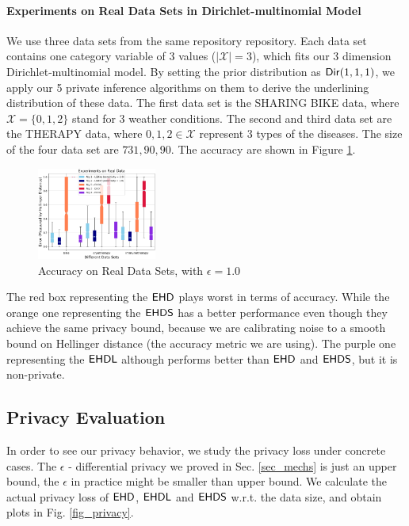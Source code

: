 \documentclass{article}
\begin{document}
\paragraph{Experiments on Real Data Sets in Dirichlet-multinomial Model}
We use three data sets from the same repository repository. Each data set contains one category variable of 3 values ($|\mathcal{X}| = 3$), which fits our 3 dimension Dirichlet-multinomial model. By setting the prior distribution as $\mathsf{Dir}(1,1,1)$, we apply our 5 private inference algorithms on them to derive the underlining distribution of these data. The first data set is the SHARING BIKE data, where $\mathcal{X} = \{0,1,2\}$ stand for 3 weather conditions. The second and third data set are the THERAPY data, where $0,1,2 \in \mathcal{X}$ represent 3 types of the diseases. The size of the four data set are $731, 90, 90$. The accuracy are shown in Figure \ref{fig_real_3d}.
\begin{figure}
\centering
\includegraphics[width=0.35\textwidth]{realdata_3d.eps}
\caption{Accuracy on Real Data Sets, with $\epsilon = 1.0$}
\label{fig_real_3d}
\end{figure}

The red box representing the $\mathsf{EHD}$ plays worst in terms of accuracy. While the orange one representing the $\mathsf{EHDS}$ has a better performance even though they achieve the same privacy bound, because we are calibrating noise to a smooth bound on Hellinger distance (the accuracy metric we are using). The purple one representing the $\mathsf{EHDL}$ although performs better than $\mathsf{EHD}$ and $\mathsf{EHDS}$, but it is non-private.

\subsection{Privacy Evaluation}
\label{subsec_experiment_privacy}
In order to see our privacy behavior, we study the privacy loss under concrete cases. The $\epsilon$ - differential privacy we proved in Sec. \ref{sec_mechs} is just an upper bound, the $\epsilon$ in practice might be smaller than upper bound. We calculate the actual privacy loss of $\mathsf{EHD}$, $\mathsf{EHDL}$ and $\mathsf{EHDS}$ w.r.t. the data size, and obtain plots in Fig. \ref{fig_privacy}.
\end{document}
